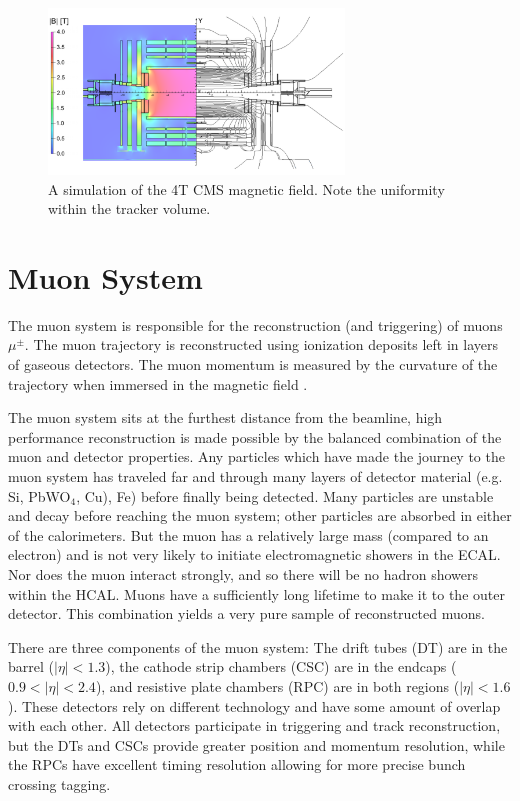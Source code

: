 \begin{figure}[hbp!]
\centering
\includegraphics[width=0.7\textwidth]{figs/magnet.png}
\caption[A simulation of the 4T CMS magnetic field.]
{A simulation of the 4T CMS magnetic field. Note the uniformity within the tracker volume.}
\label{fig:magnet}
\end{figure}

\section{Muon System}

The muon system is responsible for the reconstruction (and triggering) of muons $\mu^{\pm}$. The muon trajectory is reconstructed using ionization deposits left in layers of gaseous detectors. The muon momentum is measured by the curvature of the trajectory when immersed in the magnetic field \cite{muontdr}.

The muon system sits at the furthest distance from the beamline, high performance reconstruction is made possible by the balanced combination of the muon and detector properties. Any particles which have made the journey to the muon system has traveled far and through many layers of detector material (e.g. Si, PbWO$_{4}$, Cu), Fe) before finally being detected. Many particles are unstable and decay before reaching the muon system; other particles are absorbed in either of the calorimeters. But the muon has a relatively large mass (compared to an electron) and is not very likely to initiate electromagnetic showers in the ECAL. Nor does the muon interact strongly, and so there will be no hadron showers within the HCAL. Muons have a sufficiently long lifetime to make it to the outer detector. This combination yields a very pure sample of reconstructed muons.

There are three components of the muon system: The drift tubes (DT) are in the barrel ($|\eta|<1.3$), the cathode strip chambers (CSC) are in the endcaps ($0.9<|\eta|<2.4$), and resistive plate chambers (RPC) are in both regions ($|\eta| < 1.6$). These detectors rely on different technology and have some amount of overlap with each other. All detectors participate in triggering and track reconstruction, but the DTs and CSCs provide greater position and momentum resolution, while the RPCs have excellent timing resolution allowing for more precise bunch crossing tagging.

